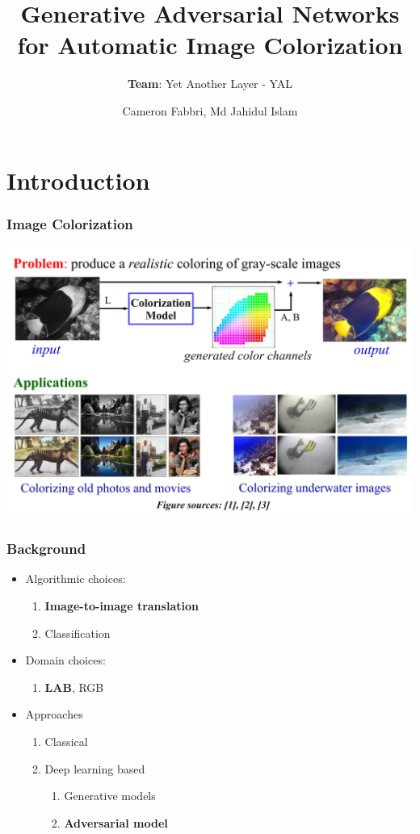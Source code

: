 \documentclass{beamer}
\title{Generative Adversarial Networks for Automatic Image Colorization}
\subtitle{\textbf{Team}: Yet Another Layer - YAL}
\author{Cameron Fabbri, Md Jahidul Islam}
\begin{document}
\date{}
\begin{frame}
\thispagestyle{empty}
\titlepage
\end{frame}

\section*{Introduction}
\begin{frame}
\frametitle{\textbf{Image Colorization}}

\includegraphics[width=\linewidth]{6.pdf}



\end{frame}

\begin{frame}
\frametitle{\textbf{Background}}
\begin{itemize}
  \item Algorithmic choices:
	\begin{enumerate}[$-$]
	\item  \textbf{Image-to-image translation} 
	\item Classification
	\end{enumerate}
	
	\item Domain choices:
  
	\begin{enumerate}[$-$]
	\item  \textbf{LAB}, RGB
	\end{enumerate}
	
	\item Approaches
  
	\begin{enumerate}[$-$]
	\item Classical
	\item Deep learning based
	\begin{enumerate}[$-$]
	  \item Generative models
	  \item \textbf{Adversarial model}
	\end{enumerate}	 
	\end{enumerate}
	
\end{itemize}
\end{frame}
\end{document}
